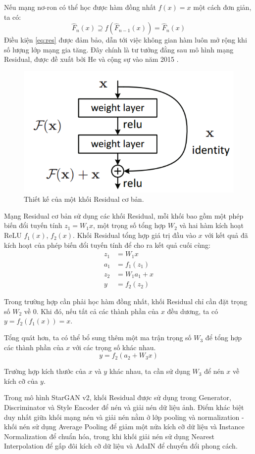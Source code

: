 \documentclass[12pt]{extreport}
\begin{document}
Nếu mạng nơ-ron có thể học được hàm đồng nhất $ f(x) = x $ một cách đơn giản, ta có:
$$ \hat{F}_{n}(x) \supseteq f(\hat{F}_{n-1}(x)) = \hat{F}_n(x) $$
Điều kiện \ref{eq:res} được đảm bảo, dẫn tới việc không gian hàm luôn mở rộng khi số lượng lớp mạng gia tăng. Đây chính là tư tưởng đằng sau mô hình mạng Residual, được đề xuất bởi He và cộng sự vào năm 2015 \cite{he2015deep}.

\begin{figure}[H]
    \centering
    \includegraphics[width=0.7\linewidth]{figure33.png}
    \caption{Thiết kế của một khối Residual cơ bản.}
\end{figure}

Mạng Residual cơ bản sử dụng các khối Residual, mỗi khối bao gồm một phép biến đổi tuyến tính $ z_1 = W_1x $, một trọng số tổng hợp $ W_2 $ và hai hàm kích hoạt ReLU $ f_1(x) $, $ f_2(x) $. Khối Residual tổng hợp giá trị đầu vào $ x $ với kết quả đã kích hoạt của phép biến đổi tuyến tính để cho ra kết quả cuối cùng:
\begin{align*}
    z_1 & = W_1x       \\
    a_1 & = f_1(z_1)   \\
    z_2 & = W_1a_1 + x \\
    y   & = f_2(z_2)
\end{align*}

Trong trường hợp cần phải học hàm đồng nhất, khối Residual chỉ cần đặt trọng số $ W_2 $ về 0. Khi đó, nếu tất cả các thành phần của $ x $ đều dương, ta có $ y = f_2(f_1(x)) = x $.

Tổng quát hơn, ta có thể bổ sung thêm một ma trận trọng số $ W_3 $ để tổng hợp các thành phần của $ x $ với các trọng số khác nhau.
$$ y = f_2(a_2 + W_3x) $$

Trường hợp kích thước của $ x $ và $ y $ khác nhau, ta cần sử dụng $ W_3 $ để nén $ x $ về kích cỡ của $ y $.

Trong mô hình StarGAN v2, khối Residual được sử dụng trong Generator, Discriminator và Style Encoder để nén và giải nén dữ liệu ảnh. Điểm khác biệt duy nhất giữa khối mạng nén và giải nén nằm ở lớp pooling và normalization - khối nén sử dụng Average Pooling để giảm một nửa kích cỡ dữ liệu và Instance Normalization để chuẩn hóa, trong khi khối giải nén sử dụng Nearest Interpolation để gấp đôi kích cỡ dữ liệu và AdaIN để chuyển đổi phong cách.
\end{document}

